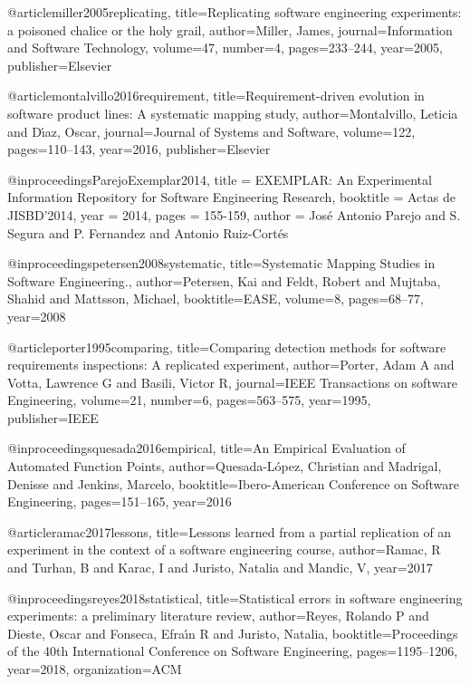 @article{miller2005replicating,
  title={Replicating software engineering experiments: a poisoned chalice or the holy grail},
  author={Miller, James},
  journal={Information and Software Technology},
  volume={47},
  number={4},
  pages={233--244},
  year={2005},
  publisher={Elsevier}
}

@article{montalvillo2016requirement,
  title={Requirement-driven evolution in software product lines: A systematic mapping study},
  author={Montalvillo, Leticia and D{\'\i}az, Oscar},
  journal={Journal of Systems and Software},
  volume={122},
  pages={110--143},
  year={2016},
  publisher={Elsevier}
}

@inproceedings{ParejoExemplar2014,
  title = {EXEMPLAR: An Experimental Information Repository for Software Engineering Research},
	booktitle = {Actas de JISBD{\textquoteright}2014},
	year = {2014},
	pages = {155-159},
	author = {Jos{\'e} Antonio Parejo and S. Segura and P. Fernandez and Antonio Ruiz-Cort{\'e}s}
}

@inproceedings{petersen2008systematic,
  title={Systematic Mapping Studies in Software Engineering.},
  author={Petersen, Kai and Feldt, Robert and Mujtaba, Shahid and Mattsson, Michael},
  booktitle={EASE},
  volume={8},
  pages={68--77},
  year={2008}
}


@article{porter1995comparing,
  title={Comparing detection methods for software requirements inspections: A replicated experiment},
  author={Porter, Adam A and Votta, Lawrence G and Basili, Victor R},
  journal={IEEE Transactions on software Engineering},
  volume={21},
  number={6},
  pages={563--575},
  year={1995},
  publisher={IEEE}
}

@inproceedings{quesada2016empirical,
  title={An Empirical Evaluation of Automated Function Points},
  author={Quesada-L{\'o}pez, Christian and Madrigal, Denisse and Jenkins, Marcelo},
  booktitle={Ibero-American Conference on Software Engineering},
  pages={151--165},
  year={2016}
}

@article{ramac2017lessons,
  title={Lessons learned from a partial replication of an experiment in the context of a software engineering course},
  author={Ramac, R and Turhan, B and Karac, I and Juristo, Natalia and Mandic, V},
  year={2017}
}

@inproceedings{reyes2018statistical,
  title={Statistical errors in software engineering experiments: a preliminary literature review},
  author={Reyes, Rolando P and Dieste, Oscar and Fonseca, Efra{\'\i}n R and Juristo, Natalia},
  booktitle={Proceedings of the 40th International Conference on Software Engineering},
  pages={1195--1206},
  year={2018},
  organization={ACM}
}

